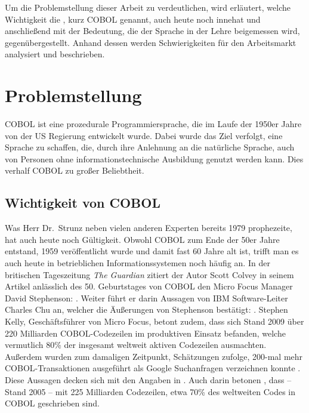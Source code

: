 Um die Problemstellung dieser Arbeit zu verdeutlichen, wird erläutert, welche Wichtigkeit die , kurz COBOL genannt, auch heute noch innehat und anschließend mit der Bedeutung, die der Sprache in der Lehre beigemessen wird, gegenübergestellt. Anhand dessen werden Schwierigkeiten für den Arbeitsmarkt analysiert und beschrieben.

\section{Problemstellung}\label{problemstellung}
 COBOL ist eine prozedurale Programmiersprache, die im Laufe der 1950er Jahre von der US Regierung entwickelt wurde. Dabei wurde das Ziel verfolgt, eine Sprache zu schaffen, die, durch ihre Anlehnung an die natürliche Sprache, auch von Personen ohne informationstechnische Ausbildung genutzt werden kann. Dies verhalf COBOL zu großer Beliebtheit.

\subsection*{Wichtigkeit von COBOL}\label{wichtigkeit}
 \cite{_ist_1979}

Was Herr Dr.\  Strunz neben vielen anderen Experten bereits 1979 prophezeite, hat auch heute noch Gültigkeit. Obwohl COBOL zum Ende der 50er Jahre entstand, 1959 veröffentlicht wurde und damit fast 60 Jahre alt ist, trifft man es auch heute in betrieblichen Informationssystemen noch häufig an. In der britischen Tageszeitung \textit{The Guardian} zitiert der Autor Scott Colvey in seinem Artikel \cite{colvey_cobol_2009} anlässlich des 50. Geburtstages von COBOL den Micro Focus Manager David Stephenson: . Weiter führt er darin Aussagen von IBM Software-Leiter Charles Chu an, welcher die Äußerungen von Stephenson bestätigt: . Stephen Kelly, Geschäftsführer von Micro Focus, betont zudem, dass sich Stand 2009 über 220 Milliarden COBOL-Codezeilen im produktiven Einsatz befanden, welche vermutlich 80\% der insgesamt weltweit aktiven Codezeilen ausmachten. Außerdem wurden zum damaligen Zeitpunkt, Schätzungen zufolge, 200-mal mehr COBOL-Transaktionen ausgeführt als Google Suchanfragen verzeichnen konnte \cite{kelly_cobol_2009}. Diese Aussagen decken sich mit den Angaben in . Auch darin betonen \citeauthor{doke_cobol_2005}, dass -- Stand 2005 -- mit 225 Milliarden Codezeilen, etwa 70\% des weltweiten Codes in COBOL geschrieben sind.

